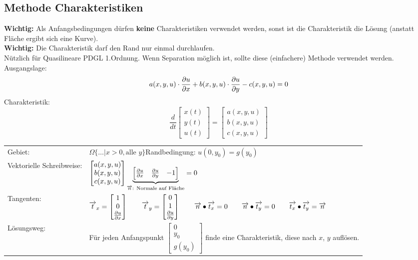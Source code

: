 \subsection{Methode Charakteristiken}

\textbf{Wichtig:} Als Anfangsbedingungen dürfen \textbf{keine} Charakteristiken verwendet werden, sonst ist die Charakteristik die Lösung (anstatt Fläche ergibt sich eine Kurve).\\
\textbf{Wichtig:} Die Charakteristik darf den Rand nur einmal durchlaufen.\\
Nützlich für Quasilineare PDGL 1.Ordnung. Wenn Separation möglich ist, sollte diese (einfachere) Methode verwendet werden.\\

Ausgangslage:
\[
    a(x,y,u)\cdot\frac{\partial u}{\partial x}+b(x,y,u)\cdot\frac{\partial u}{\partial y}-c(x,y,u)=0
\]
Charakteristik:
\[
    \frac{d}{dt} \begin{bmatrix} x(t) \\ y(t) \\ u(t) \end{bmatrix}
    = \begin{bmatrix} a(x,y,u) \\ b(x,y,u) \\ c(x,y,u) \end{bmatrix}
\]


\begin{tabular}{ll}
Gebiet:& $\Omega\{\ldots|x>0, \text{alle }y\}$\qquad Randbedingung: $u(0,y_0)=g(y_0)$\\
Vektorielle Schreibweise:& $\begin{bmatrix}
    a(x,y,u)\\ b(x,y,u)\\ c(x,y,u)
    \end{bmatrix}
\underset{\overrightarrow{n}\text{: Normale auf Fläche}}{\underbrace{\begin{bmatrix}
\frac{\partial u}{\partial x} & \frac{\partial u}{\partial y} & -1
\end{bmatrix}}}=0 $ \\[1cm]
Tangenten:& $\overrightarrow{t}_x=\begin{bmatrix}1\\0\\ \frac{\partial u}{\partial x}\end{bmatrix}\qquad 
			\overrightarrow{t}_y=\begin{bmatrix}0\\1\\ \frac{\partial u}{\partial y}\end{bmatrix}\qquad \overrightarrow{n} \bullet \overrightarrow{t_x} = 0 \qquad \overrightarrow{n} \bullet \overrightarrow{t_y} = 0 \qquad \overrightarrow{t_x} \bullet \overrightarrow{t_y} = \overrightarrow{n}$\\[1cm]

Lösungsweg: & Für jeden Anfangspunkt $\begin{bmatrix} 0\\y_0\\g(y_0)\end{bmatrix}$ finde eine Charakteristik, diese nach $x$, $y$ auflösen.
\end{tabular}

